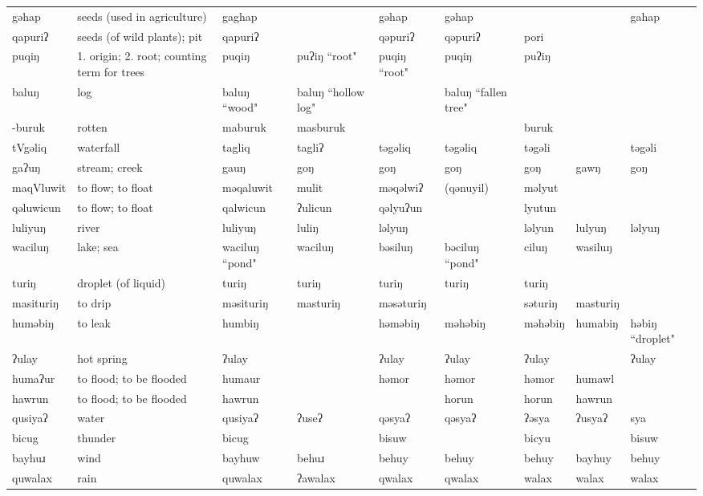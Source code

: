 \begin{landscape}
\begin{longtable}{*{9}{p{}}}
\text{*}gəhap & seeds (used in agriculture) & gaghap &  & gəhap & gəhap &  &  & gahap\\
\text{*}qapuriʔ & seeds (of wild plants); pit & qapuriʔ &  & qəpuriʔ & qəpuriʔ & pori &  & \\
\text{*}puqiŋ & 1. origin; 2. root; counting term for trees & puqiŋ & puʔiŋ ``root" & puqiŋ ``root" & puqiŋ & puʔiŋ &  & \\
\text{*}baluŋ & log & baluŋ ``wood" & baluŋ ``hollow log" &  & baluŋ ``fallen tree" &  &  & \\
\text{*}-buruk & rotten & maburuk & masburuk &  &  & buruk &  & \\
\text{*}tVgəliq & waterfall & tagliq & tagliʔ & təgəliq & təgəliq & təgəli &  & təgəli\\
\text{*}gaʔuŋ & stream; creek & gauŋ & goŋ & goŋ & goŋ & goŋ & gawŋ & goŋ\\
\text{*}maqVluwit & to flow; to float & məqaluwit & mulit & məqəlwiʔ & (qənuyil) & məlyut &  & \\
\text{*}qəluwicun & to flow; to float & qalwicun & ʔulicun & qəlyuʔun &  & lyutun &  & \\
\text{*}luliyuŋ & river & luliyuŋ & luliŋ & ləlyuŋ &  & ləlyun & lulyuŋ & ləlyuŋ\\
\text{*}waciluŋ & lake; sea & waciluŋ ``pond" & waciluŋ & bəsiluŋ & bəciluŋ ``pond" & ciluŋ & wasiluŋ & \\
\text{*}turiŋ & droplet (of liquid) & turiŋ & turiŋ & turiŋ & turiŋ & turiŋ &  & \\
\text{*}masituriŋ & to drip & məsituriŋ & masturiŋ & məsəturiŋ &  & səturiŋ & masturiŋ & \\
\text{*}huməbiŋ & to leak & humbiŋ &  & həməbiŋ & məhəbiŋ & məhəbiŋ & humabiŋ & həbiŋ ``droplet"\\
\text{*}ʔulay & hot spring & ʔulay &  & ʔulay & ʔulay & ʔulay &  & ʔulay\\
\text{*}humaʔur & to flood; to be flooded & humaur &  & həmor & həmor & həmor & humawl & \\
\text{*}hawrun & to flood; to be flooded & hawrun &  &  & horun & horun & hawrun & \\
\text{*}qusiyaʔ & water & qusiyaʔ & ʔuseʔ & qəsyaʔ & qəsyaʔ & ʔəsya & ʔusyaʔ & sya\\
\text{*}bicug & thunder & bicug &  & bisuw &  & bicyu &  & bisuw\\
\text{*}bayhuɹ & wind & bayhuw & behuɹ & behuy & behuy & behuy & bayhuy & behuy\\
\text{*}quwalax & rain & quwalax & ʔawalax & qwalax & qwalax & walax & walax & walax\\

\end{longtable}
\end{landscape}
